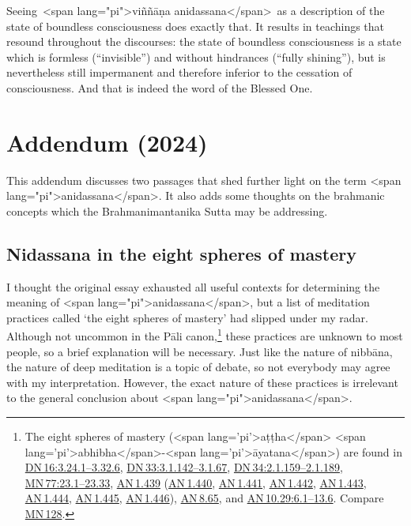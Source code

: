 \documentclass[10pt, openright]{book}
\begin{document}
Seeing <span lang="pi">viññāṇa anidassana</span> as a description of the state of boundless consciousness does exactly that. It results in teachings that resound throughout the discourses: the state of boundless consciousness is a state which is formless (“invisible”) and without hindrances (“fully shining”), but is nevertheless still impermanent and therefore inferior to the cessation of consciousness. And that is indeed the word of the Blessed One.


\chapter{Addendum (2024)}
This addendum discusses two passages that shed further light on the term <span lang="pi">anidassana</span>. It also adds some thoughts on the brahmanic concepts which the Brahmanimantanika Sutta may be addressing.




\section{Nidassana in the eight spheres of mastery}
I thought the original essay exhausted all useful contexts for determining the meaning of <span lang="pi">anidassana</span>, but a list of meditation practices called ‘the eight spheres of mastery’ had slipped under my radar. Although not uncommon in the Pāli canon,\footnote {The eight spheres of mastery (<span lang='pi'>aṭṭha</span> <span lang='pi'>abhibha</span>-<span lang='pi'>āyatana</span>) are found in \href{https://suttacentral.net/dn16/en/sujato\#3.24.1}{DN 16:3.24.1–3.32.6}, \href{https://suttacentral.net/dn33/en/sujato\#3.1.142}{DN 33:3.1.142–3.1.67}, \href{https://suttacentral.net/dn34/en/sujato\#2.1.159}{DN 34:2.1.159–2.1.189}, \href{https://suttacentral.net/mn77/en/sujato\#23.1}{MN 77:23.1–23.33}, \href{https://suttacentral.net/an1.439/en/sujato}{AN 1.439} (\href{https://suttacentral.net/an1.440/en/sujato}{AN 1.440}, \href{https://suttacentral.net/an1.441/en/sujato}{AN 1.441}, \href{https://suttacentral.net/an1.442/en/sujato}{AN 1.442}, \href{https://suttacentral.net/an1.443/en/sujato}{AN 1.443}, \href{https://suttacentral.net/an1.444/en/sujato}{AN 1.444}, \href{https://suttacentral.net/an1.445/en/sujato}{AN 1.445}, \href{https://suttacentral.net/an1.446/en/sujato}{AN 1.446}), \href{https://suttacentral.net/an8.65/en/sujato}{AN 8.65}, and \href{https://suttacentral.net/an10.29/en/sujato\#6.1}{AN 10.29:6.1–13.6}. Compare \href{https://suttacentral.net/mn128/en/sujato}{MN 128}.} these practices are unknown to most people, so a brief explanation will be necessary. Just like the nature of nibbāna, the nature of deep meditation is a topic of debate, so not everybody may agree with my interpretation. However, the exact nature of these practices is irrelevant to the general conclusion about <span lang="pi">anidassana</span>.
\end{document}
